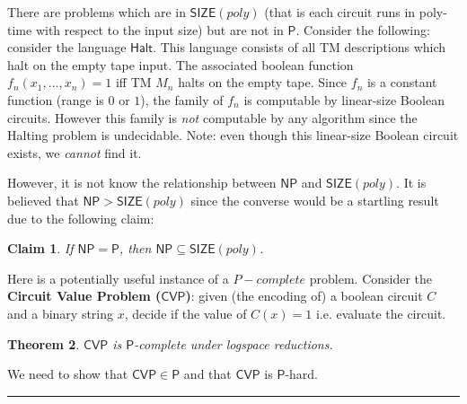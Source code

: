 \documentclass[twoside]{article}
\newcounter{lecnum}
\newtheorem{theorem}{Theorem}[lecnum]
\newtheorem{claim}[theorem]{Claim}
\newenvironment{proof}{{\bf Proof:}}{\hfill\rule{2mm}{2mm}}
\def\P{\mathsf{P}}
\def\NP{\mathsf{NP}}
\def\SIZE{\mathsf{SIZE}}
\def\CVP{\mathsf{CVP}}
\begin{document}
There are problems which are in $\SIZE (poly)$ (that is each circuit runs in poly-time with respect to the input size) but are not in $\P$. Consider the following: consider the language $\mathsf{Halt}$. This language consists of all TM descriptions which halt on the empty tape input. The associated boolean function $f_n(x_1, ..., x_n) = 1$ iff TM $M_n$ halts on the empty tape. Since $f_n$ is a constant function (range is $0$ or $1$), the family of $f_n$ is computable by linear-size Boolean circuits. However this family is \emph{not} computable by any algorithm since the Halting problem is undecidable. Note: even though this linear-size Boolean circuit exists, we \emph{cannot} find it. 

However, it is not know the relationship between $\NP$ and $\SIZE (poly)$. It is believed that $\NP > \SIZE (poly)$ since the converse would be a startling result due to the following claim:

\begin{claim}
If $\NP = \P$, then $\NP \subseteq \SIZE (poly)$.
\end{claim}   

Here is a potentially useful instance of a $P-complete$ problem. Consider the \textbf{Circuit Value Problem ($\CVP$)}: given (the encoding of) a boolean circuit $C$ and a binary string $x$, decide if the value of $C(x) = 1$ i.e. evaluate the circuit.

\begin{theorem}
$\CVP$ is $\P$-complete under logspace reductions. 
\end{theorem}
\begin{proof}
We need to show that $\CVP \in \P$ and that $\CVP$ is $\P$-hard.
\end{proof}
\end{document}
